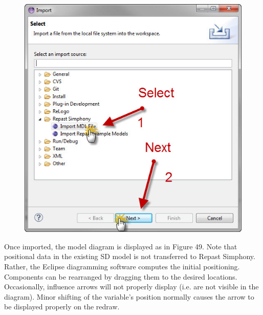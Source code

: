 \documentclass[11pt]{amsart}
\begin{document}
\clearpage

\begin{figure}[ht]
\begin{center}
\vspace{.2in}
\centerline {
\includegraphics[totalheight=0.3\textheight]{images/046.jpg}
}
\caption{}
\label{fig:046}
\end{center}
\end{figure}

Once imported, the model diagram is displayed as in Figure 49. Note that positional data in the existing SD model is not transferred to Repast Simphony. Rather, the Eclipse diagramming software computes the initial positioning. Components can be rearranged by dragging them to the desired locations. Occasionally, influence arrows will not properly display (i.e. are not visible in the diagram). Minor shifting of the variable’s position normally causes the arrow to be displayed properly on the redraw.
\end{document}
